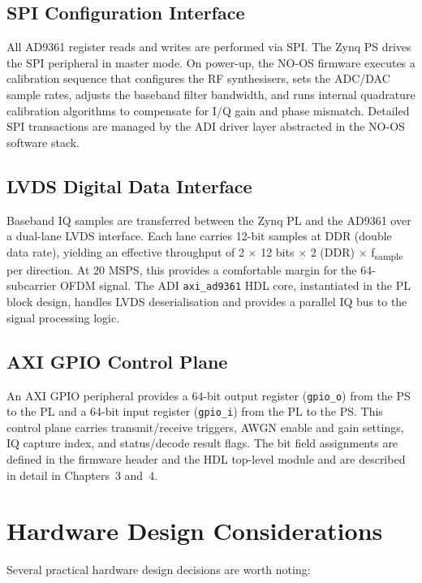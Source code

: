 \documentclass[12pt, a4paper, oneside]{report}
\begin{document}
\subsection{SPI Configuration Interface}

All AD9361 register reads and writes are performed via SPI. The Zynq PS drives the SPI peripheral in master mode. On power-up, the NO-OS firmware executes a calibration sequence that configures the RF synthesisers, sets the ADC/DAC sample rates, adjusts the baseband filter bandwidth, and runs internal quadrature calibration algorithms to compensate for I/Q gain and phase mismatch. Detailed SPI transactions are managed by the ADI driver layer abstracted in the NO-OS software stack.

\subsection{LVDS Digital Data Interface}

Baseband IQ samples are transferred between the Zynq PL and the AD9361 over a dual-lane LVDS interface. Each lane carries 12-bit samples at DDR (double data rate), yielding an effective throughput of 2 $\times$ 12 bits $\times$ 2 (DDR) $\times$ f\textsubscript{sample} per direction. At 20 MSPS, this provides a comfortable margin for the 64-subcarrier OFDM signal. The ADI \texttt{axi\_ad9361} HDL core, instantiated in the PL block design, handles LVDS deserialisation and provides a parallel IQ bus to the signal processing logic.

\subsection{AXI GPIO Control Plane}

An AXI GPIO peripheral provides a 64-bit output register (\texttt{gpio\_o}) from the PS to the PL and a 64-bit input register (\texttt{gpio\_i}) from the PL to the PS. This control plane carries transmit/receive triggers, AWGN enable and gain settings, IQ capture index, and status/decode result flags. The bit field assignments are defined in the firmware header and the HDL top-level module and are described in detail in Chapters~3 and~4.

\section{Hardware Design Considerations}

Several practical hardware design decisions are worth noting:
\end{document}

